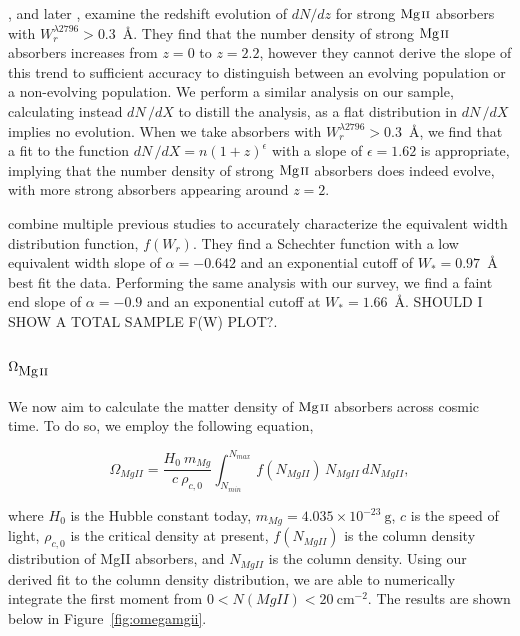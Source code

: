 \documentclass[iop,apj,numberedappendix,appendixfloats,twocolappendix]{emulateapj}
\begin{document}
\cite{Steidel1992}, and later \cite{Churchill2001}, examine the redshift evolution of $dN\!/dz$ for strong ${\hbox{{\rm Mg}\kern 0.1em{\sc ii}}}$ absorbers with $W_r^{\lambda2796} > 0.3$~{\AA}. They find that the number density of strong ${\hbox{{\rm Mg}\kern 0.1em{\sc ii}}}$ absorbers increases from $z = 0$ to $z = 2.2$, however they cannot derive the slope of this trend to sufficient accuracy to distinguish between an evolving population or a non-evolving population. We perform a similar analysis on our sample, calculating instead $dN\,/dX$ to distill the analysis, as a flat distribution in $dN\,/dX$ implies no evolution. When we take absorbers with $W_r^{\lambda2796} > 0.3$~{\AA}, we find that a fit to the function $dN\,/dX = n(1+z)^{\epsilon}$ with a slope of $\epsilon = 1.62$ is appropriate, implying that the number density of strong ${\hbox{{\rm Mg}\kern 0.1em{\sc ii}}}$ absorbers does indeed evolve, with more strong absorbers appearing around $z = 2$.

\cite{Kacprzak2011MgII} combine multiple previous studies to accurately characterize the equivalent width distribution function, $f(W_r)$. They find a Schechter function with a low equivalent width slope of $\alpha = -0.642$ and an exponential cutoff of $W_* = 0.97$~{\AA} best fit the data. Performing the same analysis with our survey, we find a faint end slope of $\alpha = -0.9$ and an exponential cutoff at $W_* = 1.66$~{\AA}. SHOULD I SHOW A TOTAL SAMPLE F(W) PLOT?.


\subsection{$\Omega_{\hbox{{\rm Mg}\kern 0.1em{\sc ii}}}$}
\label{omegamgii}

We now aim to calculate the matter density of ${\hbox{{\rm Mg}\kern 0.1em{\sc ii}}}$ absorbers across cosmic time. To do so, we employ the following equation,

\begin{equation}
\Omega_{MgII} = \frac{H_0\  m_{Mg}}{c\ \rho_{c,0}} \int_{N_{min}}^{N_{max}}\, f (N_{MgII})\, N_{MgII}\, dN_{MgII} ,
\label{eqn:omega}
\end{equation}

where $H_0$ is the Hubble constant today, $m_{Mg} = 4.035 \times 10^{-23}~\mathrm{g}$, $c$ is the speed of light, $\rho_{c,0}$ is the critical density at present, $f(N_{MgII})$ is the column density distribution of {MgII} absorbers, and $N_{MgII}$ is the column density. Using our derived fit to the column density distribution, we are able to numerically integrate the first moment from $0 < N(MgII) < 20~\mathrm{cm^{-2}}$. The results are shown below in Figure~\ref{fig:omegamgii}. 
\end{document}
